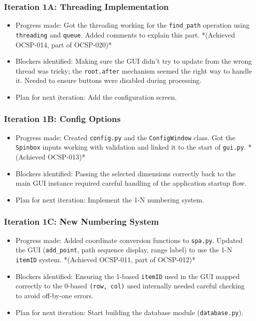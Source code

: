 \subsubsection{Iteration 1A: Threading Implementation}
\begin{itemize}
	\item Progress made: Got the threading working for the \verb|find_path| operation using \verb|threading| and \verb|queue|. Added comments to explain this part. *(Achieved OCSP-014, part of OCSP-020)*
	\item Blockers identified: Making sure the GUI didn't try to update from the wrong thread was tricky; the \verb|root.after| mechanism seemed the right way to handle it. Needed to ensure buttons were disabled during processing.
	\item Plan for next iteration: Add the configuration screen.
\end{itemize}

\subsubsection{Iteration 1B: Config Options}
\begin{itemize}
	\item Progress made: Created \verb|config.py| and the \verb|ConfigWindow| class. Got the \verb|Spinbox| inputs working with validation and linked it to the start of \verb|gui.py|. *(Achieved OCSP-013)*
	\item Blockers identified: Passing the selected dimensions correctly back to the main GUI instance required careful handling of the application startup flow.
	\item Plan for next iteration: Implement the 1-N numbering system.
\end{itemize}

\subsubsection{Iteration 1C: New Numbering System}
\begin{itemize}
	\item Progress made: Added coordinate conversion functions to \verb|spa.py|. Updated the GUI (\verb|add_point|, path sequence display, range label) to use the 1-N \verb|itemID| system. *(Achieved OCSP-011, part of OCSP-012)*
	\item Blockers identified: Ensuring the 1-based \verb|itemID| used in the GUI mapped correctly to the 0-based \verb|(row, col)| used internally needed careful checking to avoid off-by-one errors.
	\item Plan for next iteration: Start building the database module (\verb|database.py|).
\end{itemize}

